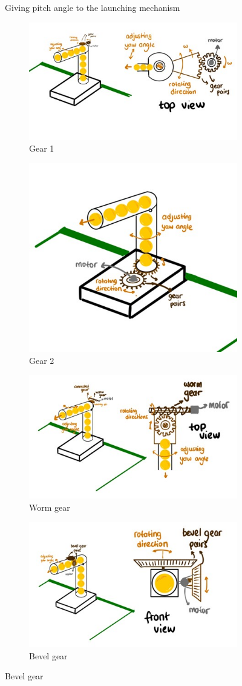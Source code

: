 \documentclass[12pt]{article}
\begin{document}
\begin{figure}[H]
\caption{Giving pitch angle to the launching mechanism  }
\label{fig:pitch}
\end{figure}


\begin{figure}[H]
\centering
\begin{subfigure}{.5\textwidth}
  \centering
  \includegraphics[width=.4\linewidth]{gear1yaw.jpg}
  \caption{Gear 1}
  \label{fig:gear1}
\end{subfigure}%
\begin{subfigure}{.5\textwidth}
  \centering
  \includegraphics[width=.4\linewidth]{gear2yaw.jpg}
  \caption{Gear 2}
  \label{fig:gear2}
\end{subfigure}
\begin{subfigure}{.5\textwidth}
  \centering
  \includegraphics[width=.4\linewidth]{wormyaw.jpg}
  \caption{Worm gear}
  \label{fig:worm_yaw}
\end{subfigure}%
\begin{subfigure}{.5\textwidth}
  \centering
  \includegraphics[width=.4\linewidth]{bevelyaw.jpg}
  \caption{Bevel gear}
  \label{fig:bevel_yaw}
\end{subfigure}%


\end{figure}
\end{document}

